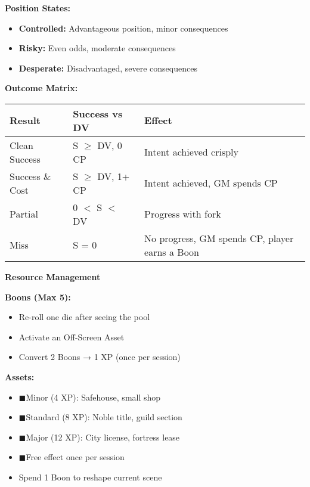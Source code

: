 \documentclass[10pt]{article}
\newcommand{\boon}{\textcolor{orange}{\ding{72}}}
\newcommand{\asset}{\textcolor{green!60!black}{$\blacksquare$}}
\begin{document}
\begin{mdframed}[backgroundcolor=background, linewidth=0pt, roundcorner=5pt]
\begin{adjustwidth}{0.2cm}{0.2cm}
\textbf{Position States:}
\begin{itemize}[leftmargin=*]
\item \textbf{Controlled:} Advantageous position, minor consequences
\item \textbf{Risky:} Even odds, moderate consequences  
\item \textbf{Desperate:} Disadvantaged, severe consequences
\end{itemize}

\textbf{Outcome Matrix:}
\begin{center}
\begin{tabular}{|l|l|l|}
\hline
\cellcolor{lightaccent} \textbf{Result} & \cellcolor{lightaccent} \textbf{Success vs DV} & \cellcolor{lightaccent} \textbf{Effect} \\
\hline
Clean Success & S $\geq$ DV, 0 CP & Intent achieved crisply \\
Success \& Cost & S $\geq$ DV, 1+ CP & Intent achieved, GM spends CP \\
Partial & 0 $<$ S $<$ DV & Progress with fork \\
Miss & S = 0 & No progress, GM spends CP, player earns a Boon \\
\hline
\end{tabular}
\end{center}
\end{adjustwidth}

\vspace{0.3cm}

\begin{mdframed}[backgroundcolor=sectionbg, linewidth=1pt, linecolor=accentcolor, roundcorner=3pt]
\textbf{\large Resource Management}
\end{mdframed}

\begin{adjustwidth}{0.2cm}{0.2cm}
\vspace{0.2cm}
\textbf{Boons (Max 5):}
\begin{itemize}[leftmargin=*]
\item \boon Re-roll one die after seeing the pool
\item \boon Activate an Off-Screen Asset
\item \boon Convert 2 Boons → 1 XP (once per session)
\end{itemize}

\textbf{Assets:}
\begin{itemize}[leftmargin=*]
\item \asset Minor (4 XP): Safehouse, small shop
\item \asset Standard (8 XP): Noble title, guild section
\item \asset Major (12 XP): City license, fortress lease
\item \asset Free effect once per session
\item Spend 1 Boon to reshape current scene
\end{itemize}


\end{adjustwidth}
\end{mdframed}
\end{document}
